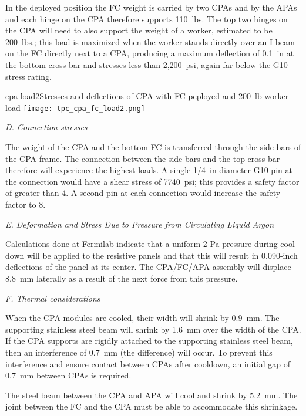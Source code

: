 In the deployed position the FC weight  is carried by two CPAs and by the APAs and each hinge on the CPA therefore supports 110~lbs.   The top two hinges on the CPA will need to also support the weight of a worker, estimated to be 200~lbs.; this load is maximized when the worker stands directly over an I-beam on the FC directly next to a CPA, producing a maximum deflection of 0.1~in at the bottom cross bar and stresses less than 2,200~psi, again far below the G10 stress rating.

\begin{cdrfigure}{cpa-load2}{Stresses and deflections of CPA with FC peployed and 200~lb worker load} 
\texttt{[image: tpc\_cpa\_fc\_load2.png]}
\end{cdrfigure}

{\it D. Connection stresses}

The weight of the CPA and the bottom FC is transferred through the side bars of the CPA frame.  The connection between the side bars and the top cross bar therefore will experience the highest loads.  A single 1/4~in diameter G10 pin at the connection would have a shear stress of 7740~psi; this provides a safety factor of greater than 4.  A second pin at each connection would increase the safety factor to 8.  

{\it E. Deformation and Stress Due to Pressure from Circulating Liquid Argon}

Calculations done at Fermilab indicate that a uniform 2-Pa pressure during cool down will be applied to the resistive panels  %
and that this will result in 0.090-inch deflections of the panel at its center.  The CPA/FC/APA assembly will displace 8.8~mm laterally as a result of the next force from this pressure.  

{\it F. Thermal considerations}

When the CPA modules are cooled, their width will shrink by 0.9~mm.  The supporting stainless steel beam will shrink by 1.6~mm over the width of the CPA.  If the CPA supports are rigidly attached to the supporting stainless steel beam, then an interference of 0.7~mm (the difference) will occur.  To prevent this interference and ensure contact between CPAs after cooldown, an initial gap of 0.7~mm between CPAs is required.  

The steel beam between the CPA and APA will cool and shrink by 5.2~mm.  The joint between the FC and the CPA must be able to accommodate this shrinkage.


